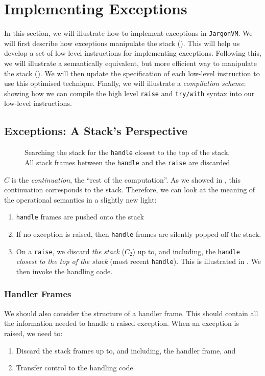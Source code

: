 \section{Implementing Exceptions}
In this section, we will illustrate how to implement exceptions in \texttt{JargonVM}. We will first describe how exceptions manipulate the stack (). This will help us develop a set of low-level instructions for implementing exceptions. Following this, we will illustrate a semantically equivalent, but more efficient way to manipulate the stack (). We will then update the specification of each low-level instruction to use this optimised technique. Finally, we will illustrate a \textit{compilation scheme}: showing how we can compile the high level \texttt{raise} and \texttt{try/with} syntax into our low-level instructions.

\subsection{Exceptions: A Stack's Perspective}\label{section:stack-manipulation}
\begin{figure}[H]
    \centering
    \caption{Searching the stack for the \texttt{handle} closest to the top of the stack. All stack frames between the \texttt{handle} and the \texttt{raise} are discarded}
    \label{fig:stack-searching}
\end{figure}
$C$ is the \textit{continuation}, the ``rest of the computation''. As we showed in , this continuation corresponds to the stack. Therefore, we can look at the meaning of the operational semantics in a slightly new light:

\begin{enumerate}
    \item \texttt{handle} frames are pushed onto the stack
    \item If no exception is raised, then \texttt{handle} frames are silently popped off the stack.
    \item On a \texttt{raise}, we discard \textit{the stack} ($C_2$) up to, and including, the \texttt{handle} \textit{closest to the top of the stack} (most recent \texttt{handle}). This is illustrated in . We then invoke the handling code.
\end{enumerate}

\subsubsection{Handler Frames}
We should also consider the structure of a handler frame. This should contain all the information needed to handle a raised exception. When an exception is raised, we need to:
\begin{enumerate}
    \item Discard the stack frames up to, and including, the handler frame, and
    \item Transfer control to the handling code
\end{enumerate}

